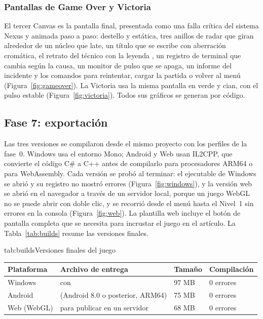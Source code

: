 \subsubsection{Pantallas de Game Over y Victoria}

El tercer Canvas es la pantalla final, presentada como una falla crítica del sistema Nexus y
animada paso a paso: destello y estática, tres anillos de radar que giran alrededor de un núcleo
que late, un título que se escribe con aberración cromática, el retrato del técnico con la leyenda
, un registro de terminal que cambia según la causa, un monitor
de pulso que se apaga, un informe del incidente y los comandos para reintentar, cargar la partida o
volver al menú (Figura~\ref{fig:gameover}). La Victoria usa la misma pantalla en verde y cian, con el
pulso estable (Figura~\ref{fig:victoria}). Todos sus gráficos se generan por código.



\subsection{Fase 7: exportación}

Las tres versiones se compilaron desde el mismo proyecto con los perfiles de la fase~0. Windows usa
el entorno Mono; Android y Web usan IL2CPP, que convierte el código C\# a C++ antes de compilarlo
para procesadores ARM64 o para WebAssembly. Cada versión se probó al terminar: el ejecutable de
Windows se abrió y su registro no mostró errores (Figura~\ref{fig:windows}), y la versión web se
abrió en el navegador a través de un servidor local, porque un juego WebGL no se puede abrir con
doble clic, y se recorrió desde el menú hasta el Nivel~1 sin errores en la consola
(Figura~\ref{fig:web}). La plantilla web incluye el botón de pantalla completa que se necesita para
incrustar el juego en el artículo. La Tabla~\ref{tab:builds} resume las versiones finales.

\begin{TablaAPA}{tab:builds}{Versiones finales del juego}
\begin{tabularx}{\linewidth}{P{2.6cm}LP{2cm}P{2.4cm}}
\toprule
Plataforma & Archivo de entrega & Tamaño & Compilación \\
\midrule
Windows &  con  & 97 MB & 0 errores \\
Android &  (Android 8.0 o posterior, ARM64) & 75 MB & 0 errores \\
Web (WebGL) &  para publicar en un servidor & 68 MB & 0 errores \\
\bottomrule
\end{tabularx}
\end{TablaAPA}


